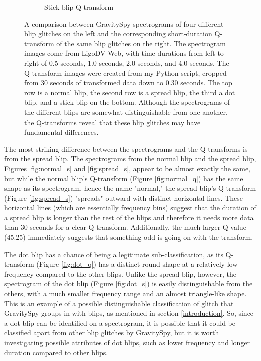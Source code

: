 \documentclass[a4paper]{article}
\begin{document}
\begin{figure}[h!]
\begin{subfigure}[t]{.29\textwidth}
		\caption{Stick blip Q-transform}
		\label{fig:stick_q}
	\end{subfigure}
	\caption{A comparison between GravitySpy spectrograms of four different blip glitches on the left and the corresponding short-duration Q-transform of the same blip glitches on the right. The spectrogram images come from LigoDV-Web, with time durations from left to right of 0.5 seconds, 1.0 seconds, 2.0 seconds, and 4.0 seconds. The Q-transform images were created from my Python script, cropped from 30 seconds of transformed data down to 0.30 seconds. The top row is a normal blip, the second row is a spread blip, the third a dot blip, and a stick blip on the bottom. Although the spectrograms of the different blips are somewhat distinguishable from one another, the Q-transforms reveal that these blip glitches may have fundamental differences.}
	\label{fig:comparison}
\end{figure}

The most striking difference between the spectrograms and the Q-transforms is from the spread blip. The spectrograms from the normal blip and the spread blip, Figures \ref{fig:normal_s} and \ref{fig:spread_s}, appear to be almost exactly the same, but while the normal blip's Q-transform (Figure \ref{fig:normal_q}) has the same shape as its spectrogram, hence the name "normal," the spread blip's Q-transform (Figure \ref{fig:spread_s}) "spreads" outward with distinct horizontal lines. These horizontal lines (which are essentially frequency bins) suggest that the duration of a spread blip is longer than the rest of the blips and therefore it needs more data than 30 seconds for a clear Q-transform. Additionally, the much larger Q-value (45.25) immediately suggests that something odd is going on with the transform.

The dot blip has a chance of being a legitimate sub-classification, as its Q-transform (Figure \ref{fig:dot_q}) has a distinct round shape at a relatively low frequency compared to the other blips. Unlike the spread blip, however, the spectrogram of the dot blip (Figure \ref{fig:dot_s}) is easily distinguishable from the others, with a much smaller frequency range and an almost triangle-like shape. This is an example of a possible distinguishable classification of glitch that GravitySpy groups in with blips, as mentioned in section \ref{introduction}. So, since a dot blip can be identified on a spectrogram, it is possible that it could be classified apart from other blip glitches by GravitySpy, but it is worth investigating possible attributes of dot blips, such as lower frequency and longer duration compared to other blips.
\end{document}
